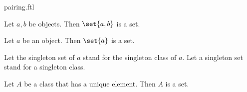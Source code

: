 \documentclass{naproche-library}
\begin{document}
\begin{smodule}[title=The Pairing Axiom]{pairing.ftl}

\begin{axiom}[forthel,title=Pairing Axiom,id=FOUNDATIONS_10_7376893816864768]
  Let $a, b$ be objects.
  Then $\set{a, b}$ is a set.
\end{axiom}

\begin{proposition}[forthel,id=FOUNDATIONS_10_7556516257202176]
  Let $a$ be an object.
  Then $\set{a}$ is a set.
\end{proposition}

\begin{convention}[forthel]
  Let the singleton set of $a$ stand for the singleton class of $a$.
  Let a singleton set stand for a singleton class.
\end{convention}

\begin{corollary}[forthel,id=FOUNDATIONS_10_8408517115379712]
  Let $A$ be a class that has a unique element.
  Then $A$ is a set.
\end{corollary}
\end{smodule}
\end{document}
